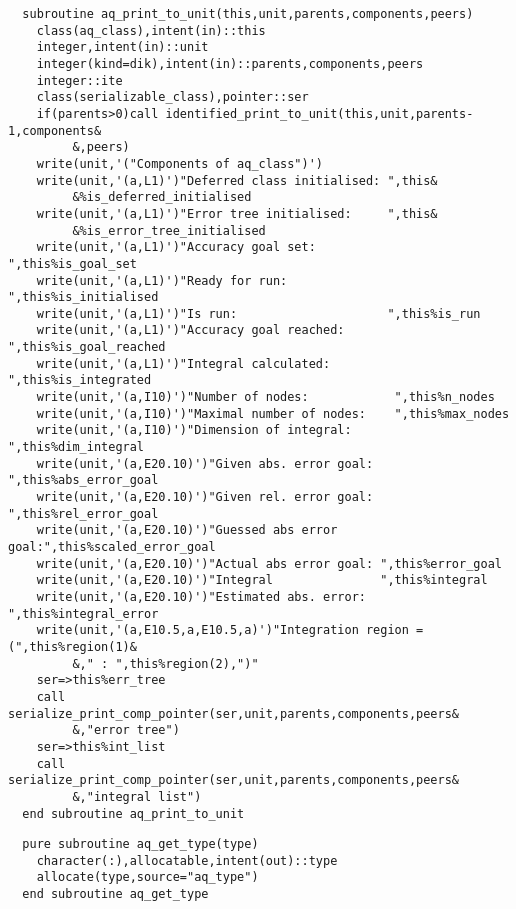 \begin{Verbatim}
  subroutine aq_print_to_unit(this,unit,parents,components,peers)
    class(aq_class),intent(in)::this
    integer,intent(in)::unit
    integer(kind=dik),intent(in)::parents,components,peers
    integer::ite
    class(serializable_class),pointer::ser
    if(parents>0)call identified_print_to_unit(this,unit,parents-1,components&
         &,peers)
    write(unit,'("Components of aq_class")')
    write(unit,'(a,L1)')"Deferred class initialised: ",this&
         &%is_deferred_initialised
    write(unit,'(a,L1)')"Error tree initialised:     ",this&
         &%is_error_tree_initialised
    write(unit,'(a,L1)')"Accuracy goal set:          ",this%is_goal_set
    write(unit,'(a,L1)')"Ready for run:              ",this%is_initialised
    write(unit,'(a,L1)')"Is run:                     ",this%is_run
    write(unit,'(a,L1)')"Accuracy goal reached:      ",this%is_goal_reached
    write(unit,'(a,L1)')"Integral calculated:        ",this%is_integrated
    write(unit,'(a,I10)')"Number of nodes:            ",this%n_nodes
    write(unit,'(a,I10)')"Maximal number of nodes:    ",this%max_nodes
    write(unit,'(a,I10)')"Dimension of integral:      ",this%dim_integral
    write(unit,'(a,E20.10)')"Given abs. error goal: ",this%abs_error_goal
    write(unit,'(a,E20.10)')"Given rel. error goal: ",this%rel_error_goal
    write(unit,'(a,E20.10)')"Guessed abs error goal:",this%scaled_error_goal
    write(unit,'(a,E20.10)')"Actual abs error goal: ",this%error_goal
    write(unit,'(a,E20.10)')"Integral               ",this%integral
    write(unit,'(a,E20.10)')"Estimated abs. error:  ",this%integral_error
    write(unit,'(a,E10.5,a,E10.5,a)')"Integration region =  (",this%region(1)&
         &," : ",this%region(2),")"
    ser=>this%err_tree
    call serialize_print_comp_pointer(ser,unit,parents,components,peers&
         &,"error tree")
    ser=>this%int_list
    call serialize_print_comp_pointer(ser,unit,parents,components,peers&
         &,"integral list")
  end subroutine aq_print_to_unit
\end{Verbatim}

\begin{Verbatim}
  pure subroutine aq_get_type(type)
    character(:),allocatable,intent(out)::type
    allocate(type,source="aq_type")
  end subroutine aq_get_type
\end{Verbatim}
  
